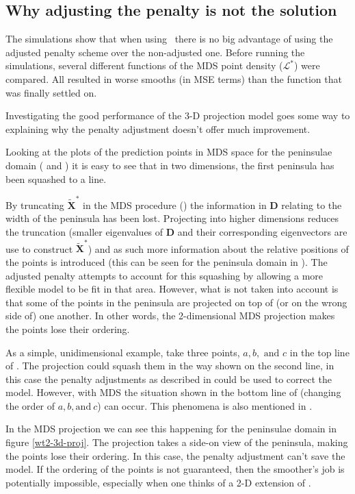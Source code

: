 \subsection{Why adjusting the penalty is not the solution}
\label{pensuck}

The simulations show that when using \mdsap\ there is no big advantage of using the adjusted penalty scheme over the non-adjusted one. Before running the simulations, several different functions of the MDS point density ($\mathcal{L}^*$) were compared. All resulted in worse smooths (in MSE terms) than the function that was finally settled on.

Investigating the good performance of the 3-D projection model goes some way to explaining why the penalty adjustment doesn't offer much improvement.

Looking at the plots of the prediction points in MDS space for the peninsulae domain ( and ) it is easy to see that in two dimensions, the first peninsula has been squashed to a line. 

By truncating $\tilde{\mathbf{X}}^*$ in the MDS procedure () the information in $\mathbf{D}$ relating to the width of the peninsula has been lost. Projecting into higher dimensions reduces the truncation (smaller eigenvalues of $\mathbf{D}$ and their corresponding eigenvectors are use to construct $\tilde{\mathbf{X}}^*$) and as such more information about the relative positions of the points is introduced (this can be seen for the peninsula domain in ). The adjusted penalty attempts to account for this squashing by allowing a more flexible model to be fit in that area. However, what is not taken into account is that some of the points in the peninsula are projected on top of (or on the wrong side of) one another. In other words, the 2-dimensional MDS projection makes the points lose their ordering. 

As a simple, unidimensional example, take three points, $a, b, \text{ and } c$ in the top line of . The projection could squash them in the way shown on the second line, in this case the penalty adjustments as described in  could be used to correct the model. However, with MDS the situation shown in the bottom line of  (changing the order of $a, b, \text{and}\ c$) can occur. This phenomena is also mentioned in .

In the MDS projection we can see this happening for the peninsulae domain in figure \ref{wt2-3d-proj}. The projection takes a side-on view of the peninsula, making the points lose their ordering. In this case, the penalty adjustment can't save the model. If the ordering of the points is not guaranteed, then the smoother's job is potentially impossible, especially when one thinks of a 2-D extension of .


